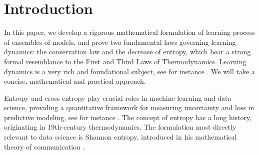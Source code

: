 \documentclass{article}
\theoremstyle{plain}
\theoremstyle{definition}
\theoremstyle{remark}
\begin{document}
\printAffiliationsAndNotice{\icmlEqualContribution}


\begin{abstract}
	We formulate the fundamental laws governing learning dynamics, namely the conservation law and the decrease of total entropy. Within this framework, we introduce an entropy-based lifelong ensemble learning method. 
	We evaluate its effectiveness by constructing an immunization mechanism to defend against transfer-based adversarial attacks on the CIFAR-10 dataset. 
	Compared with a naive ensemble formed by simply averaging models specialized on clean and adversarial samples, the resulting logifold achieves higher accuracy in most test cases, with particularly large gains under strong perturbations.
\end{abstract}

\section{Introduction}
In this paper, we develop a rigorous mathematical formulation of learning process of ensembles of models, and prove two fundamental laws governing learning dynamics: the conservation law and the decrease of entropy, which bear a strong formal resemblance to the First and Third Laws of Thermodynamics. Learning dynamics is a very rich and foundational subject, see for instance \cite{Markov_decision_processes, NNLearning,Nonlinear_systems, Dynamic_programming,  loss_surfaces, saddle,SGD_Bayesian,  mean_field, bias, convergence_generalization}. We will take a concise, mathematical and practical approach.

Entropy and cross entropy play crucial roles in machine learning and data science, providing a quantitative framework for measuring uncertainty and loss in predictive modeling, see for instance \cite{Hendrycks2017, Guo2017,decomposition_uncertainty}. The concept of entropy has a long history, originating in 19th-century thermodynamics. The formulation most directly relevant to data science is Shannon entropy, introduced in his mathematical theory of communication \cite{Shannon}. 
\end{document}
